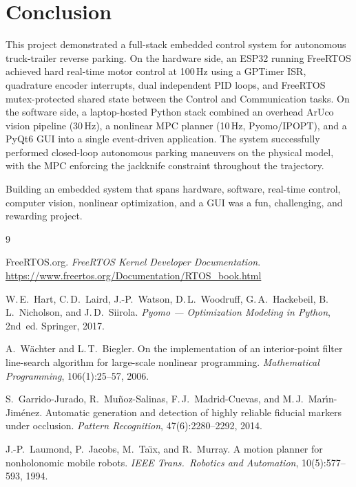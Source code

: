 \documentclass[11pt, letterpaper]{article}
\begin{document}
\section{Conclusion}

This project demonstrated a full-stack embedded control system for
autonomous truck-trailer reverse parking. On the hardware side, an ESP32
running FreeRTOS achieved hard real-time motor control at 100\,Hz using
a GPTimer ISR, quadrature encoder interrupts, dual independent PID
loops, and FreeRTOS mutex-protected shared state between the Control and
Communication tasks. On the software side, a laptop-hosted Python stack
combined an overhead ArUco vision pipeline (30\,Hz), a nonlinear MPC
planner (10\,Hz, Pyomo/IPOPT), and a PyQt6 GUI into a single
event-driven application. The system successfully performed closed-loop
autonomous parking maneuvers on the physical model, with the MPC
enforcing the jackknife constraint throughout the trajectory.

Building an embedded system that spans hardware, software, real-time
control, computer vision, nonlinear optimization, and a GUI was a fun,
challenging, and rewarding project.

\begin{thebibliography}{9}

  FreeRTOS.org.
  \textit{FreeRTOS Kernel Developer Documentation}.
  \url{https://www.freertos.org/Documentation/RTOS_book.html}

  W.\,E.~Hart, C.\,D.~Laird, J.-P.~Watson, D.\,L.~Woodruff,
  G.\,A.~Hackebeil, B.\,L.~Nicholson, and J.\,D.~Siirola.
  \textit{Pyomo --- Optimization Modeling in Python}, 2nd~ed.
  Springer, 2017.

  A.~W\"{a}chter and L.\,T.~Biegler.
  On the implementation of an interior-point filter line-search
  algorithm for large-scale nonlinear programming.
  \textit{Mathematical Programming}, 106(1):25--57, 2006.

  S.~Garrido-Jurado, R.~Mu\~{n}oz-Salinas, F.\,J.~Madrid-Cuevas,
  and M.\,J.~Mar\'{\i}n-Jim\'{e}nez.
  Automatic generation and detection of highly reliable fiducial
  markers under occlusion.
  \textit{Pattern Recognition}, 47(6):2280--2292, 2014.

  J.-P.~Laumond, P.~Jacobs, M.~Ta\"{\i}x, and R.~Murray.
  A motion planner for nonholonomic mobile robots.
  \textit{IEEE Trans.\ Robotics and Automation}, 10(5):577--593, 1994.

\end{thebibliography}
\end{document}
